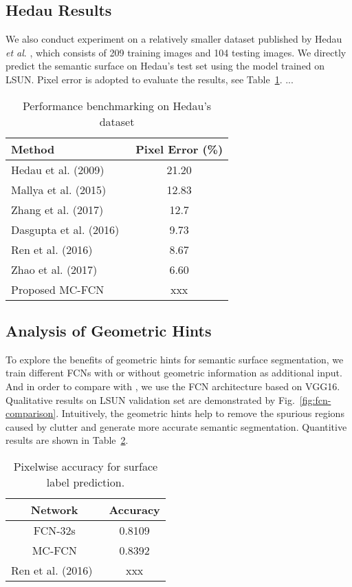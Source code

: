 \subsection{Hedau Results}
\label{sec:Hedau}
We also conduct experiment on a relatively smaller dataset published by Hedau \emph{et al}. \cite{hedau2009recovering}, which consists of 209 training images and 104 testing images. We directly predict the semantic surface on Hedau's test set using the model trained on LSUN. Pixel error is adopted to evaluate the results, see Table~\ref{table:comparison-hedau}. ...


\begin{table}
	\centering 
	\caption{Performance benchmarking on Hedau's dataset}
	\label{table:comparison-hedau}
	\begin{tabular}{l|c}
		\hline 
		Method & Pixel Error (\%) \\
		\hline
		Hedau et al. (2009)~\cite{hedau2009recovering} & 21.20 \\
		Mallya et al. (2015)~\cite{mallya2015learning} & 12.83 \\
		Zhang et al. (2017)~\cite{zhang2017learning} & 12.7 \\
		Dasgupta et al. (2016)~\cite{dasgupta2016delay} & 9.73 \\
		Ren et al. (2016)~\cite{ren2016three} & 8.67 \\
		Zhao et al. (2017)~\cite{zhao2017physics} & 6.60 \\
		Proposed MC-FCN & xxx \\
		\hline
	\end{tabular}
\end{table}


\subsection{Analysis of Geometric Hints}
\label{sec:ablation}
To explore the benefits of geometric hints for semantic surface segmentation, we train different FCNs with or without geometric information as additional input. And in order to compare with \cite{ren2016coarse}, we use the FCN architecture based on VGG16. Qualitative results on LSUN validation set are demonstrated by Fig.~\ref{fig:fcn-comparison}. Intuitively, the geometric hints help to remove the spurious regions caused by clutter and generate more accurate semantic segmentation. Quantitive results are shown in Table~\ref{table:ablation}. 

\begin{table}
	\centering
	\caption{Pixelwise accuracy for surface label prediction.}
	\label{table:ablation}
	\begin{tabular}{c|c}
		\hline
		Network & Accuracy\\
		\hline
		FCN-32s & 0.8109 \\ 
		MC-FCN  & 0.8392 \\
		Ren et al. (2016)~\cite{ren2016three} & xxx \\
		\hline
	\end{tabular}
	
\end{table}


